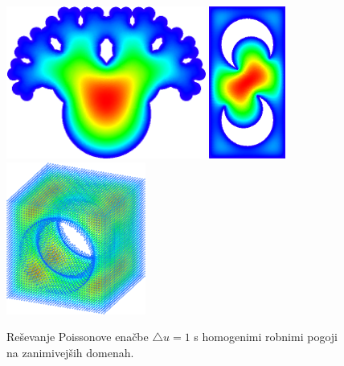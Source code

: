 \documentclass[12pt,a4paper,twoside]{article}
\theoremstyle{definition} %
\theoremstyle{plain} %
\numberwithin{equation}{section}
\newcommand{\lap}{\triangle}
\begin{document}
\begin{figure}[h]
  \centering
  \includegraphics[height=5cm]{images/poisson_weird1.png}
  \hspace{10pt}
  \includegraphics[height=5cm]{images/poisson_weird2.png}
  \hspace{10pt}
  \includegraphics[height=5cm]{images/poisson_weird3.png}
  \caption{Reševanje Poissonove enačbe $\lap u = 1$ s homogenimi robnimi pogoji na
  zanimivejših domenah.}
  \label{fig:poisson-square-weird}
\end{figure}
\end{document}
